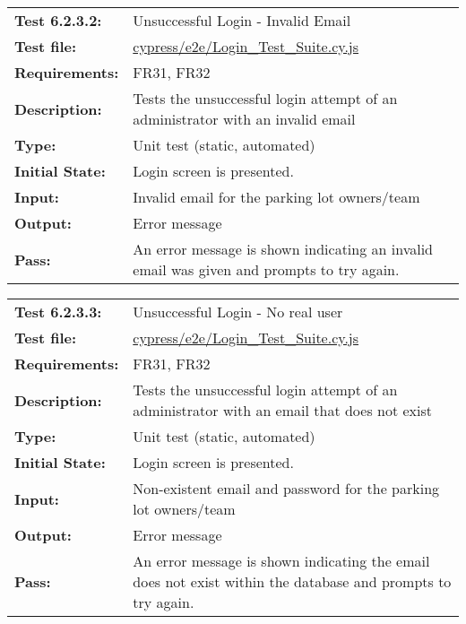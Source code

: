 \documentclass[12pt, titlepage]{article}
\begin{document}
\textcolor{red}{
\begin{center}
\begin{tabular}{|l|p{10cm}|}
    \hline
    \bf{Test} 6.2.3.2: & Unsuccessful Login - Invalid Email \\
    \bf{Test file: } &
    \href{https://github.com/parkd-app/park-d/blob/main/src/park-d-front-end/src/cypress/e2e/Login_Test_Suite.cy.js}{cypress/e2e/Login\_Test\_Suite.cy.js}\\
    \bf{Requirements}: & FR31, FR32\\
    \bf{Description}: & Tests the unsuccessful login attempt of an administrator
    with an invalid email\\
    \bf{Type}: & Unit test (static, automated) \\
    \bf{Initial State}: & Login screen is presented. \\
    \bf{Input}: & Invalid email for the parking lot owners/team \\
    \bf{Output}: & Error message \\
    \bf{Pass}: &  An error message is shown indicating an invalid email was
    given and prompts to try again.\\
    \hline
\end{tabular}
\end{center}}

\textcolor{red}{
\begin{center}
\begin{tabular}{|l|p{10cm}|}
    \hline
    \bf{Test} 6.2.3.3: & Unsuccessful Login - No real user \\
    \bf{Test file: } &
    \href{https://github.com/parkd-app/park-d/blob/main/src/park-d-front-end/src/cypress/e2e/Login_Test_Suite.cy.js}{cypress/e2e/Login\_Test\_Suite.cy.js}\\
    \bf{Requirements}: & FR31, FR32\\
    \bf{Description}: & Tests the unsuccessful login attempt of an administrator
    with an email that does not exist \\
    \bf{Type}: & Unit test (static, automated) \\
    \bf{Initial State}: & Login screen is presented. \\
    \bf{Input}: & Non-existent email and password for the parking lot
    owners/team \\
    \bf{Output}: & Error message \\
    \bf{Pass}: &  An error message is shown indicating the email does not exist
    within the database and prompts to try again.\\
    \hline
\end{tabular}
\end{center}}
\end{document}
